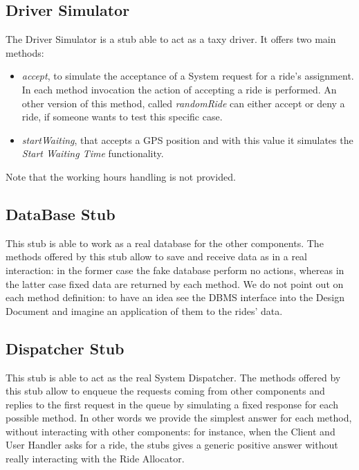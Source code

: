 \documentclass[\mainpath/main]{subfiles}
\begin{document}
\subsection{Driver Simulator}
\label{ProgramStubsAndTestDataRequired:ProgramStubs:DriverSimulator}

The Driver Simulator is a stub able to act as a taxy driver. It offers two main methods:
\begin{itemize}
	\item \textit{accept}, to simulate the acceptance of a System request for a ride's assignment. In each method invocation the action of accepting a ride is performed. An other version of this method, called \textit{randomRide} can either accept or deny a ride, if someone wants to test this specific case.
	\item \textit{startWaiting}, that accepts a GPS position and with this value it simulates the \textit{Start Waiting Time} functionality.
\end{itemize}
Note that the working hours handling is not provided.

\subsection{DataBase Stub}
\label{ProgramStubsAndTestDataRequired:ProgramStubs:DataBaseStub}

This stub is able to work as a real database for the other components. The methods offered by this stub allow to save and receive data as in a real interaction: in the former case the fake database perform no actions, whereas in the latter case fixed data are returned by each method. We do not point out on each method definition: to have an idea see the DBMS interface into the Design Document and imagine an application of them to the rides' data. 

\subsection{Dispatcher Stub}
\label{ProgramStubsAndTestDataRequired:ProgramStubs:DispatcherStub}

This stub is able to act as the real System Dispatcher. The methods offered by this stub allow to enqueue the requests coming from other components and replies to the first request in the queue by simulating a fixed response for each possible method. In other words we provide the simplest answer for each method, without interacting with other components: for instance, when the Client and User Handler asks for a ride, the stubs gives a generic positive answer without really interacting with the Ride Allocator.
\end{document}
